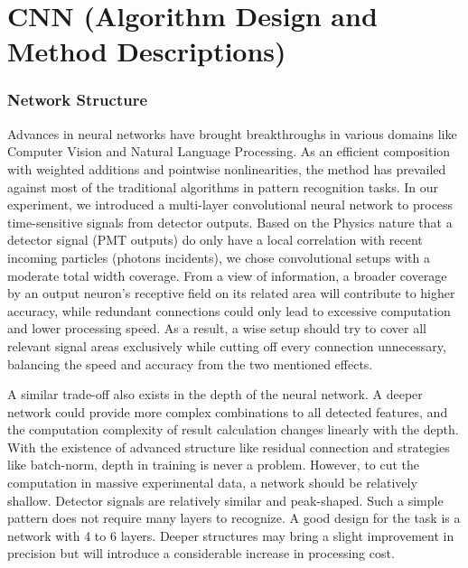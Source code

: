 \section{CNN (Algorithm Design and Method Descriptions)}

\subsubsection{Network Structure}

Advances in neural networks have brought breakthroughs in various domains like Computer Vision and Natural Language Processing. As an efficient composition with weighted additions and pointwise nonlinearities, the method has prevailed against most of the traditional algorithms in pattern recognition tasks. In our experiment, we introduced a multi-layer convolutional neural network to process time-sensitive signals from detector outputs. Based on the Physics nature that a detector signal (PMT outputs) do only have a local correlation with recent incoming particles (photons incidents), we chose convolutional setups with a moderate total width coverage. From a view of information, a broader coverage by an output neuron's receptive field on its related area will contribute to higher accuracy, while redundant connections could only lead to excessive computation and lower processing speed. As a result, a wise setup should try to cover all relevant signal areas exclusively while cutting off every connection unnecessary, balancing the speed and accuracy from the two mentioned effects.

A similar trade-off also exists in the depth of the neural network. A deeper network could provide more complex combinations to all detected features, and the computation complexity of result calculation changes linearly with the depth. With the existence of advanced structure like residual connection and strategies like batch-norm, depth in training is never a problem. However, to cut the computation in massive experimental data, a network should be relatively shallow. Detector signals are relatively similar and peak-shaped. Such a simple pattern does not require many layers to recognize. A good design for the task is a network with 4 to 6 layers. Deeper structures may bring a slight improvement in precision but will introduce a considerable increase in processing cost.

